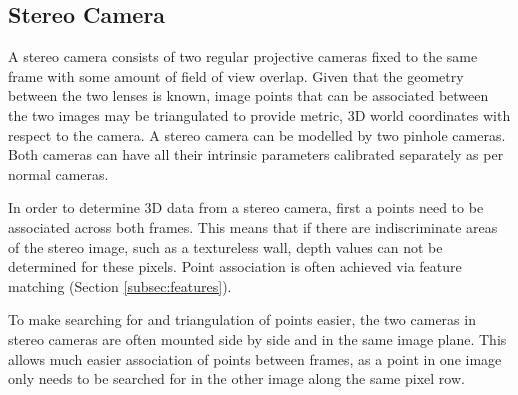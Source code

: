 \subsection{Stereo Camera}
\label{subsec:stereo_cam}

A stereo camera consists of two regular projective cameras fixed to the same frame with some amount of field of view overlap.  Given that the geometry between the two lenses is known, image points that can be associated between the two images may be triangulated to provide metric, 3D world coordinates with respect to the camera.  A stereo camera can be modelled by two pinhole cameras.  Both cameras can have all their intrinsic parameters calibrated separately as per normal cameras.  

In order to determine 3D data from a stereo camera, first a points need to be associated across both frames.  This means that if there are indiscriminate areas of the stereo image, such as a textureless wall, depth values can not be determined for these pixels. Point association is often achieved via feature matching (Section \ref{subsec:features}).

To make searching for and triangulation of points easier, the two cameras in stereo cameras are often mounted side by side and in the same image plane.  This allows much easier association of points between frames, as a point in one image only needs to be searched for in the other image along the same pixel row.


